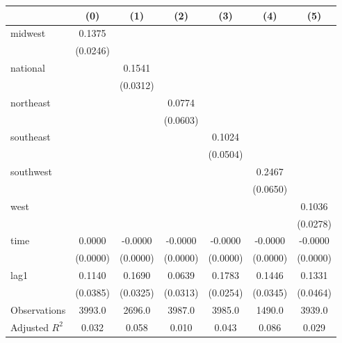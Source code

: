 \begin{tabular}{lcccccc}
\toprule
 & (0) & (1) & (2) & (3) & (4) & (5) \\
\midrule
midwest & 0.1375 &  &  &  &  &  \\
\vspace{0.2cm}
 & (0.0246) &  &  &  &  &  \\
national &  & 0.1541 &  &  &  &  \\
\vspace{0.2cm}
 &  & (0.0312) &  &  &  &  \\
northeast &  &  & 0.0774 &  &  &  \\
\vspace{0.2cm}
 &  &  & (0.0603) &  &  &  \\
southeast &  &  &  & 0.1024 &  &  \\
\vspace{0.2cm}
 &  &  &  & (0.0504) &  &  \\
southwest &  &  &  &  & 0.2467 &  \\
\vspace{0.2cm}
 &  &  &  &  & (0.0650) &  \\
west &  &  &  &  &  & 0.1036 \\
\vspace{0.2cm}
 &  &  &  &  &  & (0.0278) \\
time & 0.0000 & -0.0000 & -0.0000 & -0.0000 & -0.0000 & -0.0000 \\
\vspace{0.2cm}
 & (0.0000) & (0.0000) & (0.0000) & (0.0000) & (0.0000) & (0.0000) \\
lag1 & 0.1140 & 0.1690 & 0.0639 & 0.1783 & 0.1446 & 0.1331 \\
\vspace{0.2cm}
 & (0.0385) & (0.0325) & (0.0313) & (0.0254) & (0.0345) & (0.0464) \\
\midrule
Observations & 3993.0 & 2696.0 & 3987.0 & 3985.0 & 1490.0 & 3939.0 \\
Adjusted $R^2$ & 0.032 & 0.058 & 0.010 & 0.043 & 0.086 & 0.029 \\
\bottomrule
\end{tabular}
